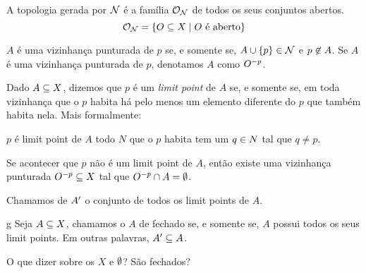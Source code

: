 \begin{definition}
	A topologia gerada por $\mathcal{N}$ é a família $\mathcal{O}_{\mathcal{N}}$ de todos os seus conjuntos abertos.
	\[
		\mathcal{O}_{\mathcal{N}} = \left\{ O \subseteq X \mid \text{$O$ é aberto}\right\}
	\]
\end{definition}

\begin{definition}
	$A$ é uma vizinhança punturada de $p$ se, e somente se, $A \cup \left\{p\right\} \in \mathcal{N}$ e $p \not\in A$. Se $A$ é uma vizinhança punturada de $p$, denotamos $A$ como $O^{-p}$.
\end{definition}

\begin{definition}
	Dado $A \subseteq X$, dizemos que $p$ é um \textit{limit point} de $A$ se, e somente se, em toda vizinhança que o $p$ habita há pelo menos um elemento diferente do $p$ que também habita nela. Mais formalmente:
	\begin{center}
		$p$ é limit point de $A$ \sse todo $N$ que o $p$ habita tem um $q \in N$ tal que $q \neq p$.
	\end{center}

	Se acontecer que $p$ não é um limit point de $A$, então existe uma vizinhança punturada $O^{-p} \subseteq X$ tal que $O^{-p} \cap A = \emptyset$.
\end{definition}

\begin{definition}
	Chamamos de $A^{\prime}$ o conjunto de todos os limit points de $A$.
\end{definition}

\begin{definition}
g	Seja $A \subseteq X$, chamamos o $A$ de fechado se, e somente se, $A$ possui todos os seus limit points. Em outras palavras, $A^{\prime} \subseteq A$.
\end{definition}

\begin{question}
	\label{universo-fechado}
	\label{vazio-fechado}
	O que dizer sobre os $X$ e $\emptyset$? São fechados?
\end{question}

